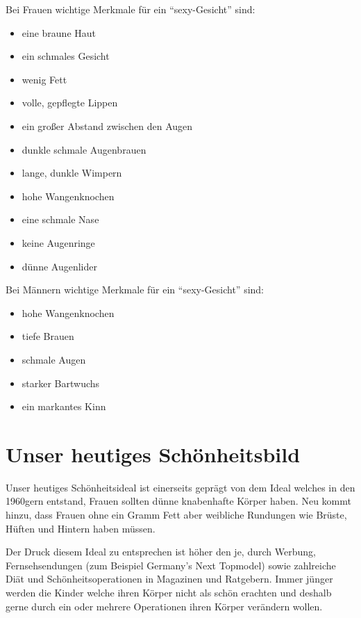 \newpage
Bei Frauen wichtige Merkmale für ein \enquote{sexy-Gesicht} sind:
\begin{multicols}{2}
\begin{itemize}
	\item eine braune Haut
	\item ein schmales Gesicht
	\item wenig Fett
	\item volle, gepflegte Lippen
	\item ein großer Abstand zwischen den Augen
	\item dunkle schmale Augenbrauen
	\item lange, dunkle Wimpern
	\item hohe Wangenknochen
	\item eine schmale Nase
	\item keine Augenringe
	\item dünne Augenlider
\end{itemize}
\end{multicols}

Bei Männern wichtige Merkmale für ein \enquote{sexy-Gesicht} sind:
\begin{multicols}{2}
\begin{itemize}
	\item hohe Wangenknochen
	\item tiefe Brauen
	\item schmale Augen
	\item starker Bartwuchs
	\item ein markantes Kinn
\end{itemize}
\end{multicols}


\section{Unser heutiges Schönheitsbild}
Unser heutiges Schönheitsideal ist einerseits geprägt von dem Ideal welches in den 1960gern entstand,
Frauen sollten dünne knabenhafte Körper haben. Neu kommt hinzu, dass Frauen ohne ein Gramm Fett aber
weibliche Rundungen wie Brüste, Hüften und Hintern haben müssen.

Der Druck diesem Ideal zu entsprechen ist höher den je, durch Werbung, Fernsehsendungen (zum Beispiel
Germany’s Next Topmodel) sowie zahlreiche Diät und Schönheitsoperationen in Magazinen und
Ratgebern. Immer jünger werden die Kinder welche ihren Körper nicht als schön erachten und deshalb
gerne durch ein oder mehrere Operationen ihren Körper verändern wollen.

